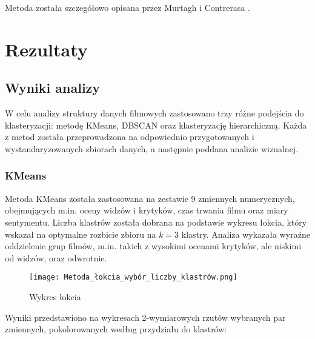 \documentclass[a4paper,12pt,titlepage]{article}
\begin{document}
Metoda została szczegółowo opisana przez Murtagh i Contrerasa \cite{murtagh2012algorithms}.


\section{Rezultaty}

\subsection{Wyniki analizy}

W celu analizy struktury danych filmowych zastosowano trzy różne podejścia do klasteryzacji: metodę KMeans, DBSCAN oraz klasteryzację hierarchiczną. Każda z metod została przeprowadzona na odpowiednio przygotowanych i wystandaryzowanych zbiorach danych, a następnie poddana analizie wizualnej.

\subsubsection{KMeans}

Metoda KMeans została zastosowana na zestawie 9 zmiennych numerycznych, obejmujących m.in. oceny widzów i krytyków, czas trwania filmu oraz miary sentymentu. Liczba klastrów została dobrana na podstawie wykresu łokcia, który wskazał na optymalne rozbicie zbioru na $k = 3$ klastry. Analiza wykazała wyraźne oddzielenie grup filmów, m.in. takich z wysokimi ocenami krytyków, ale niskimi od widzów, oraz odwrotnie.

\begin{figure}[H]
\centering
\texttt{[image: Metoda\_łokcia\_wybór\_liczby\_klastrów.png]}
\caption{Wykres łokcia}
\end{figure}

Wyniki przedstawiono na wykresach 2-wymiarowych rzutów wybranych par zmiennych, pokolorowanych według przydziału do klastrów:
\end{document}
